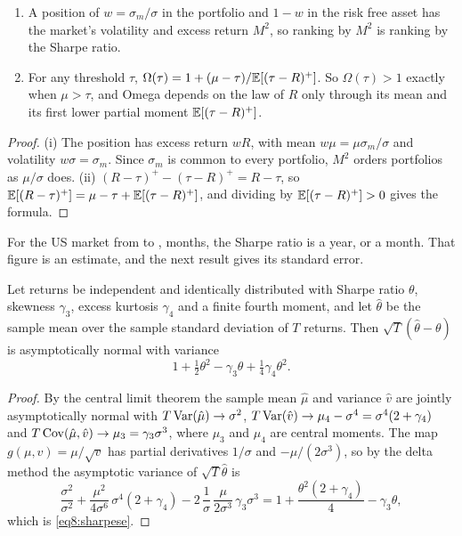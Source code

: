 \begin{chapterrefs}
\begin{proposition}\label{prop8:m2}
\begin{enumerate}[label=(\roman*)]
  \item A position of $w=\sigma_m/\sigma$ in the portfolio and $1-w$ in the risk free asset has the
  market's volatility and excess return $M^2$, so ranking by $M^2$ is ranking by the Sharpe ratio.
  \item For any threshold $\tau$, $\Omega(\tau)=1+(\mu-\tau)/\mathbb{E}[(\tau-R)^+]$. So $\Omega(\tau)>1$ exactly
  when $\mu>\tau$, and Omega depends on the law of $R$ only through its mean and its first lower partial
  moment $\mathbb{E}[(\tau-R)^+]$.
\end{enumerate}
\end{proposition}
\begin{proof}
(i) The position has excess return $wR$, with mean $w\mu=\mu\sigma_m/\sigma$ and volatility
$w\sigma=\sigma_m$. Since $\sigma_m$ is common to every portfolio, $M^2$ orders portfolios as $\mu/\sigma$
does. (ii) $(R-\tau)^+-(\tau-R)^+=R-\tau$, so $\mathbb{E}[(R-\tau)^+]=\mu-\tau+\mathbb{E}[(\tau-R)^+]$, and dividing by
$\mathbb{E}[(\tau-R)^+]>0$ gives the formula.
\end{proof}

For the US market from \prFirst{} to \prLast, \prT{} months, the Sharpe ratio is \prSR{} a year, or
\prSRm{} a month. That figure is an estimate, and the next result gives its standard error.

\begin{proposition}\label{prop8:sharpese}
Let returns be independent and identically distributed with Sharpe ratio $\theta$, skewness $\gamma_3$,
excess kurtosis $\gamma_4$ and a finite fourth moment, and let $\hat\theta$ be the sample mean over the
sample standard deviation of $T$ returns. Then $\sqrt T(\hat\theta-\theta)$ is asymptotically normal
with variance
\begin{equation}\label{eq8:sharpese}
  1+\tfrac12\theta^2-\gamma_3\theta+\tfrac14\gamma_4\theta^2 .
\end{equation}
\end{proposition}
\begin{proof}
By the central limit theorem the sample mean $\hat\mu$ and variance $\hat v$ are jointly asymptotically
normal with $T\operatorname{Var}(\hat\mu)\to\sigma^2$, $T\operatorname{Var}(\hat v)\to\mu_4-\sigma^4=\sigma^4(2+\gamma_4)$ and
$T\operatorname{Cov}(\hat\mu,\hat v)\to\mu_3=\gamma_3\sigma^3$, where $\mu_3$ and $\mu_4$ are central moments. The map
$g(\mu,v)=\mu/\sqrt v$ has partial derivatives $1/\sigma$ and $-\mu/(2\sigma^3)$, so by the delta
method the asymptotic variance of $\sqrt T\hat\theta$ is
\[
  \frac{\sigma^2}{\sigma^2}+\frac{\mu^2}{4\sigma^6}\,\sigma^4(2+\gamma_4)
  -2\,\frac{1}{\sigma}\,\frac{\mu}{2\sigma^3}\,\gamma_3\sigma^3
  =1+\frac{\theta^2(2+\gamma_4)}{4}-\gamma_3\theta,
\]
which is \cref{eq8:sharpese}.
\end{proof}


\end{chapterrefs}
